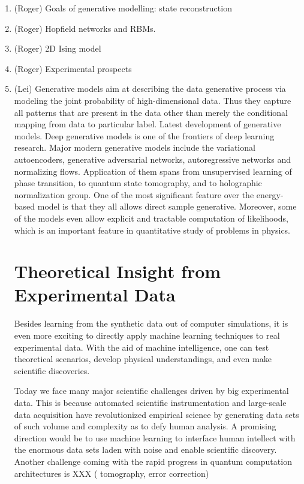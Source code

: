 \documentclass[aps,prb,floatfix,amsmath,amssymb,amsfonts,10pt,floatfix,longbibliography]{revtex4-1}
\begin{document}
\begin{enumerate}
\item (Roger) Goals of generative modelling: state reconstruction
\item (Roger) Hopfield networks and RBMs.
\item (Roger) 2D Ising model
\item (Roger) Experimental prospects

\item (Lei) Generative models aim at describing the data generative process via modeling the joint probability of high-dimensional data. Thus they capture all patterns that are present in the data other than merely the conditional mapping from data to particular label. Latest development of generative models. Deep generative models is one of the frontiers of deep learning research. Major modern generative models include the variational autoencoders, generative adversarial networks, autoregressive networks and normalizing flows. Application of them spans from unsupervised learning of phase transition, to quantum state tomography, and to holographic normalization group. One of the most significant feature over the energy-based model is that they all allows direct sample generative. Moreover, some of the models even allow explicit and tractable computation of likelihoods, which is an important feature in quantitative study of problems in physics. 


\section{Theoretical Insight from Experimental Data}
\label{sec:data}
Besides learning from the synthetic data out of computer simulations, it is even more exciting to directly apply machine learning techniques to real experimental data. With the aid of machine intelligence, one can test theoretical scenarios, develop physical understandings, and even make scientific discoveries. 

Today we face many major scientific challenges driven by big experimental data. This is because automated scientific instrumentation and large-scale data acquisition have revolutionized empirical science by generating data sets of such volume and complexity as to defy human analysis. A promising direction would be to use machine learning to interface human intellect with the 
enormous data sets laden with noise and enable scientific discovery. 
Another challenge coming with the rapid progress in quantum computation architectures is XXX ( tomography, error correction) 


\end{enumerate}
\end{document}
